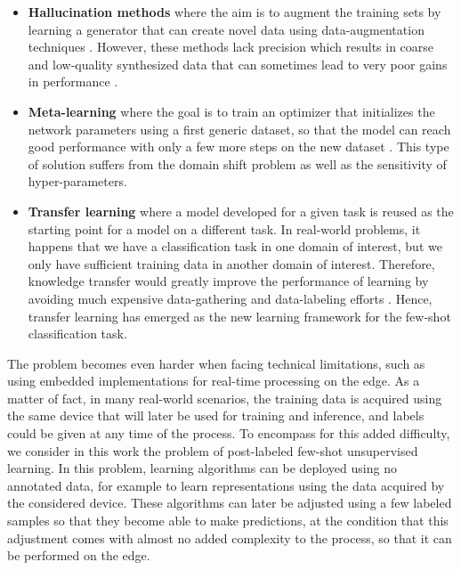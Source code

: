 \documentclass[runningheads]{llncs}
\begin{document}
\begin{itemize}
    \item \textbf{Hallucination methods} where the aim is to augment the training sets by learning a generator that can create novel data using data-augmentation techniques \cite{chen2019look_few_shot}. However, these methods lack precision which results in coarse and low-quality synthesized data that can sometimes lead to very poor gains in performance \cite{wang2019few_shot_survey}.
    
    \item \textbf{Meta-learning} where the goal is to train an optimizer that initializes the network parameters using a first generic dataset, so that the model can reach good performance with only a few more steps on the new dataset \cite{thrun2012learning_learn}. This type of solution suffers from the domain shift problem \cite{chen2019look_few_shot} as well as the sensitivity of hyper-parameters.
    
    \item \textbf{Transfer learning} where a model developed for a given task is reused as the starting point for a model on a different task. In real-world problems, it happens that we have a classification task in one domain of interest, but we only have sufficient training data in another domain of interest. Therefore, knowledge transfer would greatly improve the performance of learning by avoiding much expensive data-gathering and data-labeling efforts \cite{pan2010transfer_learning}. Hence, transfer learning has emerged as the new learning framework for the few-shot classification task.
\end{itemize}

The problem becomes even harder when facing technical limitations, such as using embedded implementations for real-time processing on the edge. As a matter of fact, in many real-world scenarios, the training data is acquired using the same device that will later be used for training and inference, and labels could be given at any time of the process. To encompass for this added difficulty, we consider in this work the problem of post-labeled few-shot unsupervised learning. In this problem, learning algorithms can be deployed using no annotated data, for example to learn representations using the data acquired by the considered device. These algorithms can later be adjusted using a few labeled samples so that they become able to make predictions, at the condition that this adjustment comes with almost no added complexity to the process, so that it can be performed on the edge.
\end{document}
